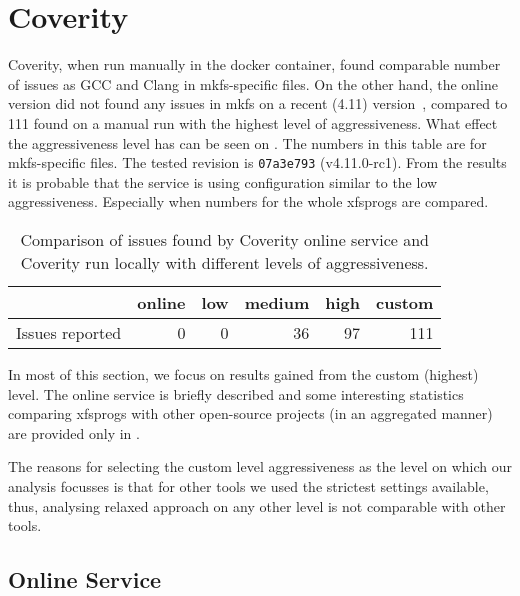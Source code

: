 \section{Coverity}\label{chap:results:coverity}

Coverity, when run manually in the docker container, found comparable number of
issues as GCC and Clang in mkfs-specific files. On the other hand, the online
version did not found any issues in mkfs on a recent (4.11)
version~\cite{CoverityXfsprogs}, compared to 111 found on a manual run with the
highest level of aggressiveness. What effect the aggressiveness level has can
be seen on . The numbers in this table are
for mkfs-specific files. The tested revision is {\tt 07a3e793} (v4.11.0-rc1).
From the results it is probable that the service is using configuration similar
to the low aggressiveness.  Especially when numbers for the whole xfsprogs are
compared.


\begin{table}[h]
\begin{tabular}{|l||r|r|r|r|r|}
\hline
& online & low & medium & high & custom \\
\hline
Issues reported & 0 & 0 & 36 & 97 & 111 \\
\hline
\end{tabular}
\caption{Comparison of issues found by Coverity online service and Coverity run
locally with different levels of aggressiveness.}
\label{tab:results:coverity:levels}
\end{table}

In most of this section, we focus on results gained from the custom (highest)
level. The online service is briefly described and some interesting statistics
comparing xfsprogs with other open-source projects (in an aggregated manner)
are provided only in .

The reasons for selecting the custom level aggressiveness as the level on which
our analysis focusses is that for other tools we used the strictest settings
available, thus, analysing relaxed approach on any other level is not
comparable with other tools.

\subsection{Online Service}\label{chap:results:coverity:online}

